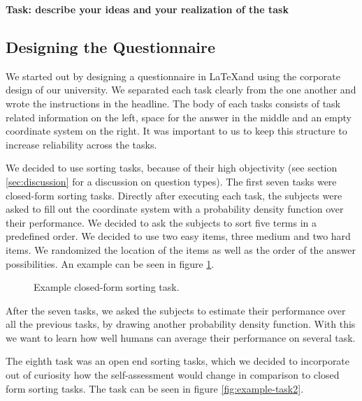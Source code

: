 \documentclass[../main/main.tex]{subfiles}
\begin{document}
	
	\textbf{Task: describe your ideas and your realization of the task}
	
	\subsection{Designing the Questionnaire}
	
	We started out by designing a questionnaire in \LaTeX and using the corporate design of our university. We separated each task clearly from the one another and wrote the instructions in the headline. The body of each tasks consists of task related information on the left, space for the answer in the middle and an empty coordinate system on the right. It was important to us to keep this structure to increase reliability across the tasks.
	
	We decided to use sorting tasks, because of their high objectivity (see section \ref{sec:discussion} for a discussion on question types). The first seven tasks were closed-form sorting tasks. Directly after executing each task, the subjects were asked to fill out the coordinate system with a probability density function over their performance. We decided to ask the subjects to sort five terms in a predefined order. We decided to use two easy items, three medium and two hard items. We randomized the location of the items as well as the order of the answer possibilities. An example can be seen in figure \ref{fig:example-task}.
	
	\begin{figure}[h]
		\label{fig:example-task}
		\centering
		\captionsetup{justification=centering}
		\caption{Example closed-form sorting task.}
	\end{figure} 
	
	After the seven tasks, we asked the subjects to estimate their performance over all the previous tasks, by drawing another probability density function. With this we want to learn how well humans can average their performance on several task. 
		
	 The eighth task was an open end sorting tasks, which we decided to incorporate out of curiosity how the self-assessment would change in comparison to closed form sorting tasks. The task can be seen in figure \ref{fig:example-task2}.
	 
\end{document}
